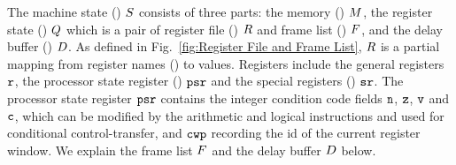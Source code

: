 The machine state () $S$ consists of three parts:
the memory () $M$, 
the register state () $Q$
which is a pair of register file 
() $R$ and frame list () $F$,
and the delay buffer () $D$.
As defined in Fig.~\ref{fig:Register File and Frame List},
$R$ is a partial mapping
from register names () to values.
Registers include the general registers $\texttt{r}$,
the processor state register () $\texttt{psr}$
and the special registers () $\texttt{sr}$.
The processor state register $\texttt{psr}$ contains
the integer condition code fields $\texttt{n}$,
$\texttt{z}$, $\texttt{v}$ and $\texttt{c}$,
which can be modified by the arithmetic and logical instructions
and used for conditional control-transfer,
and $\texttt{cwp}$ recording the id of the current register window.
We explain the frame list $F$ and the delay buffer
$D$ below.

